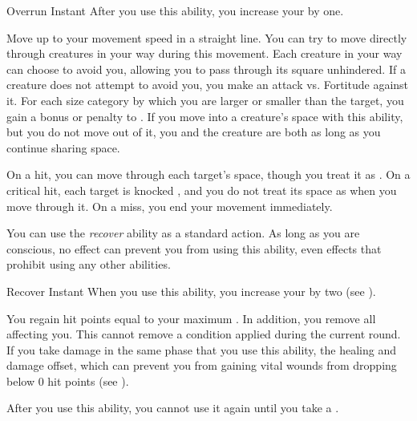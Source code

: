         \begin{instantability}{Overrun}
            \label{Overrun}
            Instant
            \rankline
            After you use this ability, you increase your  by one.

            Move up to your movement speed in a straight line.
            You can try to move directly through creatures in your way during this movement.
            Each creature in your way can choose to avoid you, allowing you to pass through its square unhindered.
            If a creature does not attempt to avoid you, you make an attack vs. Fortitude against it.
            For each size category by which you are larger or smaller than the target, you gain a  bonus or penalty to .
            If you move into a creature's space with this ability, but you do not move out of it, you and the creature are both \squeezing as long as you continue sharing space.

            On a hit, you can move through each target's space, though you treat it as .
            On a critical hit, each target is knocked \prone, and you do not treat its space as  when you move through it.
            On a miss, you end your movement immediately.
        \end{instantability}

         You can use the \textit{recover} ability as a standard action.
        As long as you are conscious, no effect can prevent you from using this ability, even effects that prohibit using any other abilities.
        \begin{instantability}{Recover}
            \label{Recover}
            Instant
            \rankline
            When you use this ability, you increase your  by two (see ).

            You regain hit points equal to your maximum .
            In addition, you remove all  affecting you.
            This cannot remove a condition applied during the current round.
            If you take damage in the same phase that you use this ability, the healing and damage offset, which can prevent you from gaining vital wounds from dropping below 0 hit points (see ).

            After you use this ability, you cannot use it again until you take a .
        \end{instantability}

